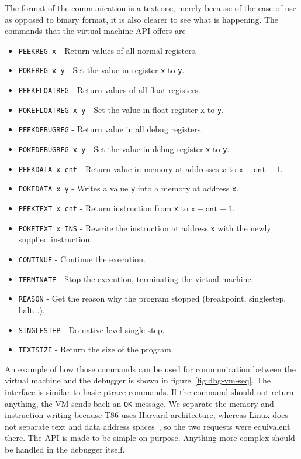 The format of the communication is a text one, merely because of the ease
of use as opposed to binary format, it is also clearer to see what is
happening. The commands that the virtual machine API offers are
\begin{itemize}
    \item \texttt{PEEKREG x} - Return values of all normal registers.
    \item \texttt{POKEREG x y} - Set the value in register \texttt{x} to
        \texttt{y}.
    \item \texttt{PEEKFLOATREG} - Return values of all float registers.
    \item \texttt{POKEFLOATREG x y} - Set the value in float register
        \texttt{x} to \texttt{y}.
    \item \texttt{PEEKDEBUGREG} - Return value in all debug registers.
    \item \texttt{POKEDEBUGREG x y} - Set the value in debug register
        \texttt{x} to \texttt{y}.
    \item \texttt{PEEKDATA x cnt} - Return value in memory at addresses $x$ to $\texttt{x} + \texttt{cnt} - 1$.
    \item \texttt{POKEDATA x y} - Writes a value \texttt{y} into a memory at
        address \texttt{x}.
    \item \texttt{PEEKTEXT x cnt} - Return instruction from \texttt{x} to $\texttt{x} + \texttt{cnt} - 1$.
    \item \texttt{POKETEXT x INS} - Rewrite the instruction at address
        \texttt{x} with the newly supplied instruction.
    \item \texttt{CONTINUE} - Continue the execution.
    \item \texttt{TERMINATE} - Stop the execution, terminating the virtual machine.
    \item \texttt{REASON} - Get the reason why the program stopped (breakpoint,
        singlestep, halt...).
    \item \texttt{SINGLESTEP} - Do native level single step.
    \item \texttt{TEXTSIZE} - Return the size of the program.
\end{itemize}

An example of how those commands can be used for communication between the
virtual machine and the debugger is shown in figure~\ref{fig:dbg-vm-seq}. The
interface is similar to basic ptrace commands. If the command should not return
anything, the VM sends back an \texttt{OK} message. We separate the memory and
instruction writing because T86 uses Harvard architecture, whereas Linux does
not separate text and data address spaces~\cite{ptrace}, so the two requests
were equivalent there. The API is made to be simple on purpose. Anything more
complex should be handled in the debugger itself.

